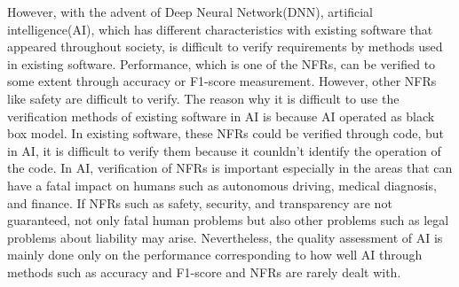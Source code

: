 \documentclass[journal,article,submit,moreauthors,pdftex]{Definitions/mdpi}
\begin{document}
However, with the advent of Deep Neural Network(DNN), artificial intelligence(AI), which has different characteristics with existing software that appeared throughout society, is difficult to verify requirements by methods used in existing software.
Performance, which is one of the NFRs, can be verified to some extent through accuracy or F1-score measurement. However, other NFRs like safety are difficult to verify.
The reason why it is difficult to use the verification methods of existing software in AI is because AI operated as black box model. In existing software, these NFRs could be verified through code, but in AI, it is difficult to verify them because it counldn't identify the operation of the code.
In AI, verification of NFRs is important especially in the areas that can have a fatal impact on humans such as autonomous driving\cite{ai-driving-bajarski,ai-driving-levinson}, medical diagnosis\cite{ai-medical-ramsundar,ai-medical-vieira,ai-medical-xai-holzinger,ai-medical-krause,ai-medical-tan,ai-medical-pesapane,ai-medical-miller}, and finance\cite{ai-finance-fu}.
If NFRs such as safety, security, and transparency are not guaranteed, not only fatal human problems but also other problems such as legal problems about liability may arise.
Nevertheless, the quality assessment of AI is mainly done only on the performance corresponding to how well AI through methods such as accuracy and F1-score and NFRs are rarely dealt with.
\end{document}
